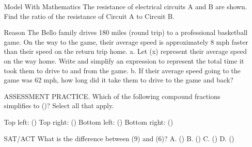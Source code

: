 \documentclass{article}
\newenvironment{practice}[2]{}{}        %
\newcommand{\answer}[1]{}               %
\newcommand{\placeholder}[2]{}          %
\newcommand{\te}[1]{}                   %
\begin{document}
\begin{practice}{32}{3}
Model With Mathematics The resistance of electrical circuits A and B are shown. Find the ratio of the resistance of Circuit A to Circuit B.
\placeholder{diagram}{Two rectangular circuit loops. Larger circuit A has resistor on left labeled (\frac{x^2-25}{x-4}) (\Omega), battery on right, and A in center. Smaller circuit B has battery on left, resistor on right labeled (\frac{x+5}{x^2-16}) (\Omega), and B in center.}
\answer{((x-5)(x+4):1) or (x^2-x-20:1).}
\end{practice}
\begin{practice}{33}{3}
Reason The Bello family drives 180 miles (round trip) to a professional basketball game. On the way to the game, their average speed is approximately 8 mph faster than their speed on the return trip home.
a. Let (x) represent their average speed on the way home. Write and simplify an expression to represent the total time it took them to drive to and from the game.
b. If their average speed going to the game was 62 mph, how long did it take them to drive to the game and back?
\answer{a. (\frac{180x+720}{x(x+8)}) or (\frac{180(x+4)}{x(x+8)}). b. (\approx3.1) h.}
\end{practice}
\begin{practice}{34}{3}
ASSESSMENT PRACTICE. Which of the following compound fractions simplifies to ()? Select all that apply.
\te{Choices are unlabeled checkboxes, here identified by position.}
Top left: ()
Top right: ()
Bottom left: ()
Bottom right: ()
\answer{Top left and bottom right.}
\end{practice}
\begin{practice}{35}{1}
SAT/ACT What is the difference between (9) and (6)?
A. ()
B. ()
C. ()
D. ()
\answer{C}
\end{practice}
\end{document}
